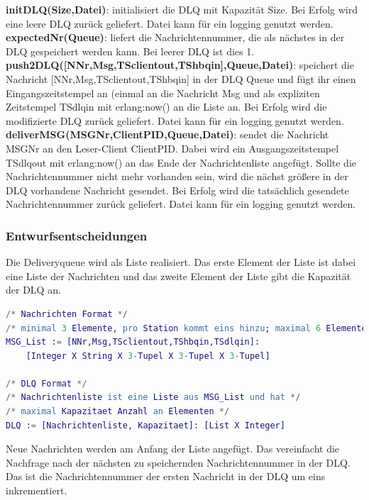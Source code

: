 \documentclass{article}
\begin{document}
\textbf{initDLQ(Size,Datei)}: initialisiert die DLQ mit Kapazität Size. Bei Erfolg wird eine leere DLQ zurück geliefert.
Datei kann für ein logging genutzt werden.\\

\textbf{expectedNr(Queue)}: liefert die Nachrichtennummer, die als nächstes in der DLQ gespeichert werden kann.
Bei leerer DLQ ist dies 1.\\

\textbf{push2DLQ([NNr,Msg,TSclientout,TShbqin],Queue,Datei)}: speichert die Nachricht [NNr,Msg,TSclientout,TShbqin] in
der DLQ Queue und fügt ihr einen Eingangszeitstempel an (einmal an die Nachricht Msg und als expliziten Zeitstempel
TSdlqin mit erlang:now() an die Liste an. Bei Erfolg wird die modifizierte DLQ zurück geliefert. Datei kann für ein
logging genutzt werden.\\

\textbf{deliverMSG(MSGNr,ClientPID,Queue,Datei)}: sendet die Nachricht MSGNr an den Leser-Client ClientPID. Dabei wird
ein Ausgangszeitstempel TSdlqout mit erlang:now() an das Ende der Nachrichtenliste angefügt. Sollte die Nachrichtennummer
nicht mehr vorhanden sein, wird die nächst größere in der DLQ vorhandene Nachricht gesendet. Bei Erfolg wird die
tatsächlich gesendete Nachrichtennummer zurück geliefert. Datei kann für ein logging genutzt werden.\\

\subsubsection{Entwurfsentscheidungen}
Die Deliveryqueue wird als Liste realisiert. Das erste Element der Liste ist dabei eine Liste der Nachrichten und das
zweite Element der Liste gibt die Kapazität der DLQ an.
\begin{lstlisting}[language=erlang]
/* Nachrichten Format */
/* minimal 3 Elemente, pro Station kommt eins hinzu; maximal 6 Elemente */
MSG_List := [NNr,Msg,TSclientout,TShbqin,TSdlqin]:
    [Integer X String X 3-Tupel X 3-Tupel X 3-Tupel]

/* DLQ Format */
/* Nachrichtenliste ist eine Liste aus MSG_List und hat */
/* maximal Kapazitaet Anzahl an Elementen */
DLQ := [Nachrichtenliste, Kapazitaet]: [List X Integer]
\end{lstlisting}

Neue Nachrichten werden am Anfang der Liste angefügt. Das vereinfacht die Nachfrage nach der nächsten zu speichernden
Nachrichtennummer in der DLQ. Das ist die Nachrichtennummer der ersten Nachricht in der DLQ um eins inkrementiert.
\end{document}
